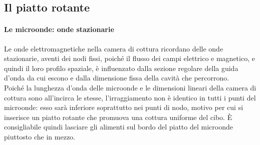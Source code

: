 \documentclass{article}
\begin{document}
\begin{figure}[h]
\centering
{}
\label{fig: cubed graph}
\end{figure}
\vspace*{-0.3in}
\subsection{Il piatto rotante}
\paragraph{Le microonde: onde stazionarie} Le onde elettromagnetiche nella camera di cottura ricordano delle onde stazionarie, aventi dei nodi fissi, poiché il flusso dei campi elettrico e magnetico, e quindi il loro profilo spaziale, è influenzato dalla sezione regolare della guida d'onda da cui escono e dalla dimensione fissa della cavità che percorrono.\\
Poiché la lunghezza d'onda delle microonde e le dimensioni lineari della camera di cottura sono all'incirca le stesse, l'irraggiamento non è identico in tutti i punti del microonde: esso sarà inferiore soprattutto nei punti di nodo, motivo per cui si inserisce un piatto rotante che promuova una cottura uniforme del cibo. È consigliabile quindi lasciare gli alimenti sul bordo del piatto del microonde piuttosto che in mezzo.     
 \begin{figure}[h]
\centering
{}
\label{fig: cubed graph}
\end{figure}
\end{document}
